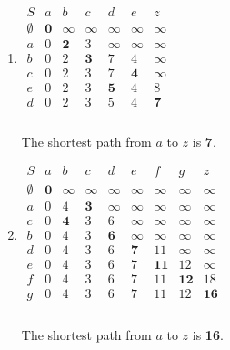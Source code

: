 \documentclass[a4paper]{article}
\begin{document}
	\begin{enumerate}[label = \alph*)]
	    \item 
	    $\begin{array}{c|cccccc}
	         S & a & b & c & d & e & z  \\
	         \hline
	         \emptyset & \textbf{0} & \infty & \infty & \infty & \infty & \infty \\
	         a & 0 & \textbf{2} & 3 & \infty & \infty & \infty \\
	         b & 0 & 2 & \textbf{3} & 7 & 4 & \infty \\
	         c & 0 & 2 & 3 & 7 & \textbf{4} & \infty \\
	         e & 0 & 2 & 3 & \textbf{5} & 4 & 8 \\
	         d & 0 & 2 & 3 & 5 & 4 & \textbf{7} \\
	    \end{array}$\\ \\
	    The shortest path from $a$ to $z$ is \textbf{7}.
	    \item
	    $\begin{array}{c|cccccccc}
	         S & a & b & c & d & e & f & g & z  \\
	         \hline
	         \emptyset & \textbf{0} & \infty & \infty & \infty & \infty & \infty & \infty & \infty \\
	         a & 0 & 4 & \textbf{3} & \infty & \infty & \infty & \infty & \infty \\
	         c & 0 & \textbf{4} & 3 & 6 & \infty & \infty & \infty & \infty \\
	         b & 0 & 4 & 3 & \textbf{6} & \infty & \infty & \infty & \infty \\
	         d & 0 & 4 & 3 & 6 & \textbf{7} & 11 & \infty & \infty \\
	         e & 0 & 4 & 3 & 6 & 7 & \textbf{11} & 12 & \infty \\
	         f & 0 & 4 & 3 & 6 & 7 & 11 & \textbf{12} & 18 \\
	         g & 0 & 4 & 3 & 6 & 7 & 11 & 12 & \textbf{16} \\
	    \end{array}$\\ \\
	    The shortest path from $a$ to $z$ is \textbf{16}.
	\end{enumerate}
\end{document}
